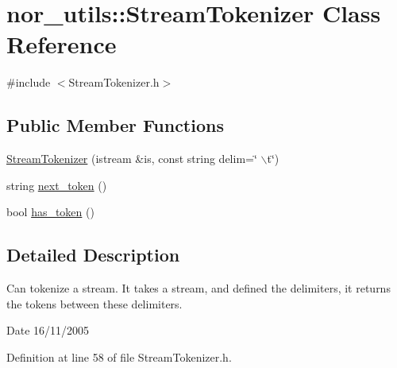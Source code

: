 \hypertarget{classnor__utils_1_1StreamTokenizer}{
\section{nor\_\-utils::StreamTokenizer Class Reference}
\label{classnor__utils_1_1StreamTokenizer}
}


{\ttfamily \#include $<$StreamTokenizer.h$>$}

\subsection*{Public Member Functions}
\begin{DoxyCompactItemize}
\item 
\hyperlink{classnor__utils_1_1StreamTokenizer_a9a06612a0473016c96b09a10a891117b}{StreamTokenizer} (istream \&is, const string delim=\char`\"{} $\backslash$t\char`\"{})
\item 
string \hyperlink{classnor__utils_1_1StreamTokenizer_acb0ebaeff2aac10c02b463a994cb1dc1}{next\_\-token} ()
\item 
bool \hyperlink{classnor__utils_1_1StreamTokenizer_a16acf21421cefcc3c45c54eb0ac8810e}{has\_\-token} ()
\end{DoxyCompactItemize}


\subsection{Detailed Description}
Can tokenize a stream. It takes a stream, and defined the delimiters, it returns the tokens between these delimiters. \begin{DoxyDate}{Date}
16/11/2005 
\end{DoxyDate}


Definition at line 58 of file StreamTokenizer.h.



